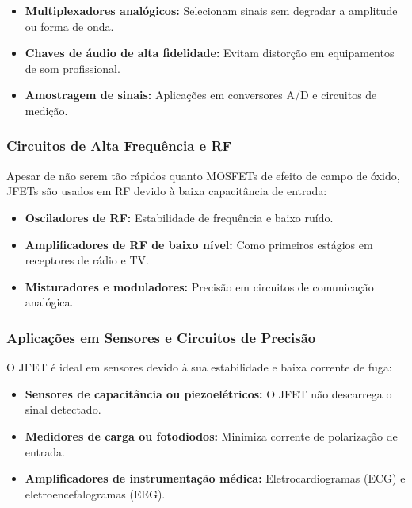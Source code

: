 \documentclass[12pt]{article}
\begin{document}
\begin{itemize}
    \item \textbf{Multiplexadores analógicos:} Selecionam sinais sem degradar a amplitude ou forma de onda.
    
    \item \textbf{Chaves de áudio de alta fidelidade:} Evitam distorção em equipamentos de som profissional.
    
    \item \textbf{Amostragem de sinais:} Aplicações em conversores A/D e circuitos de medição.
\end{itemize}

\subsubsection{Circuitos de Alta Frequência e RF}

Apesar de não serem tão rápidos quanto MOSFETs de efeito de campo de óxido, JFETs são usados em RF devido à baixa capacitância de entrada:

\begin{itemize}
    \item \textbf{Osciladores de RF:} Estabilidade de frequência e baixo ruído.
    
    \item \textbf{Amplificadores de RF de baixo nível:} Como primeiros estágios em receptores de rádio e TV.
    
    \item \textbf{Misturadores e moduladores:} Precisão em circuitos de comunicação analógica.
\end{itemize}

\subsubsection{Aplicações em Sensores e Circuitos de Precisão}

O JFET é ideal em sensores devido à sua estabilidade e baixa corrente de fuga:

\begin{itemize}
    \item \textbf{Sensores de capacitância ou piezoelétricos:} O JFET não descarrega o sinal detectado.
    
    \item \textbf{Medidores de carga ou fotodiodos:} Minimiza corrente de polarização de entrada.
    
    \item \textbf{Amplificadores de instrumentação médica:} Eletrocardiogramas (ECG) e eletroencefalogramas (EEG).
\end{itemize}
\end{document}
